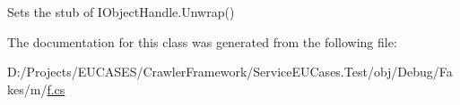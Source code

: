 Sets the stub of I\-Object\-Handle.\-Unwrap()



The documentation for this class was generated from the following file\-:\begin{DoxyCompactItemize}
\item 
D\-:/\-Projects/\-E\-U\-C\-A\-S\-E\-S/\-Crawler\-Framework/\-Service\-E\-U\-Cases.\-Test/obj/\-Debug/\-Fakes/m/\hyperlink{m_2f_8cs}{f.\-cs}\end{DoxyCompactItemize}
